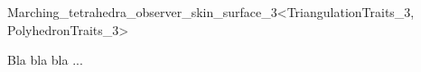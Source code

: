 \ccRefPageBegin

\begin{ccRefClass}{Marching_tetrahedra_observer_skin_surface_3<TriangulationTraits_3,
    PolyhedronTraits_3>}

Bla bla bla ...

\ccDefinition
  

\ccIsModel


\ccTypes

\ccCreation
{}


\ccOperations


\end{ccRefClass}

\ccRefPageEnd

